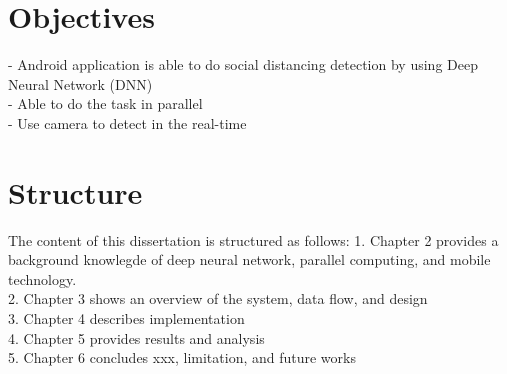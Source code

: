     \section{Objectives}
        -	Android application is able to do social distancing detection by using Deep Neural Network (DNN) \\
        -	Able to do the task in parallel \\
        -	Use camera to detect in the real-time \\

    \section{Structure}
        The content of this dissertation is structured as follows:
        1.	Chapter 2 provides a background knowlegde of deep neural network, parallel computing, and mobile technology. \\
        2.	Chapter 3 shows an overview of the system, data flow, and design  \\
        3.	Chapter 4 describes implementation \\
        4.	Chapter 5 provides results and analysis \\
        5.	Chapter 6 concludes xxx, limitation, and future works  \\
